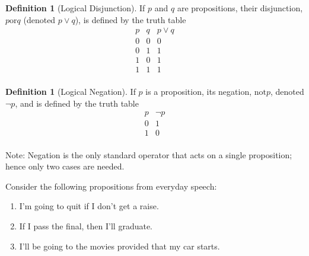 \documentclass[10pt,]{book}
\theoremstyle{plain}
\theoremstyle{definition}
\newtheorem{definition}[theorem]{Definition}
\theoremstyle{definition}
\theoremstyle{definition}
\theoremstyle{definition}
\begin{document}
%
\begin{definition}[Logical Disjunction]\label{def-disjunction}
\label{notation-2}
 If \(p\) and \(q\) are propositions, their disjunction, \(p \textrm{or} q\) (denoted \(p \lor q\)), is defined by the truth table \begin{equation*}
\begin{array}{ccc}
 p & q & p\lor q \\
 \hline
 0 & 0 & 0 \\
 0 & 1 & 1 \\
 1 & 0 & 1 \\
 1 & 1 & 1 \\
\end{array}
\end{equation*}
%
\end{definition}
\begin{definition}[Logical Negation]\label{def-negation}
\label{notation-3}
 If \(p\) is a proposition, its negation, \(\textrm{not} p\),  denoted \(\neg p\), and is defined by the truth table
\begin{equation*}\begin{array}{cc}
 p & \neg p \\
\hline
 0 & 1 \\
 1 & 0 \\
\end{array}
\end{equation*}
%
\end{definition}
\par
Note: Negation is the only standard operator that acts on a single proposition; hence only two cases are needed.%
\par
Consider the following propositions from everyday speech:%
\par
\leavevmode%
\begin{enumerate}[label=\alph*]
\item\hypertarget{li-6}{}I'm going to quit if I don't get a raise.%
\item\hypertarget{li-7}{}If I pass the final, then I'll graduate.%
\item\hypertarget{li-8}{}I'll be going to the movies provided that my car starts.%
\end{enumerate}
\end{document}
